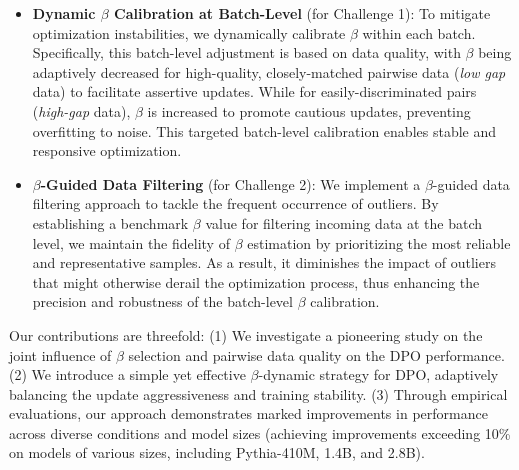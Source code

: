 \begin{itemize}[leftmargin=*]
  \item \textbf{Dynamic $\beta$ Calibration at Batch-Level} (for Challenge 1): To mitigate optimization instabilities, we dynamically calibrate $\beta$ within each batch. Specifically, this batch-level adjustment is based on data quality, with $\beta$ being adaptively decreased for high-quality, closely-matched pairwise data (\ie \emph{low gap} data) to facilitate assertive updates. While for easily-discriminated pairs (\ie \emph{high-gap} data), $\beta$ is increased to promote cautious updates, preventing overfitting to noise.
  This targeted batch-level calibration enables stable and responsive optimization.
  \item \textbf{$\beta$-Guided Data Filtering} (for Challenge 2): We implement a $\beta$-guided data filtering approach to tackle the frequent occurrence of outliers. By establishing a benchmark $\beta$ value for filtering incoming data at the batch level, we maintain the fidelity of $\beta$ estimation by prioritizing the most reliable and representative samples. As a result, it diminishes the impact of outliers that might otherwise derail the optimization process, thus enhancing the precision and robustness of the batch-level $\beta$ calibration.
\end{itemize}

Our contributions are threefold: (1) We investigate a pioneering study on the joint influence of $\beta$ selection and pairwise data quality on the DPO performance. (2) We introduce a simple yet effective $\beta$-dynamic strategy for DPO, adaptively balancing the update aggressiveness and training stability. (3) Through empirical evaluations, our approach demonstrates marked improvements in performance across diverse conditions and model sizes
(\eg achieving improvements exceeding 10\% on models of various sizes, including Pythia-410M, 1.4B, and 2.8B).

